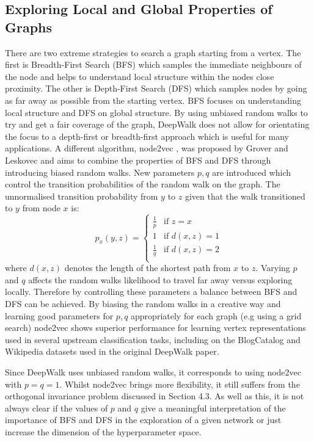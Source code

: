 \documentclass[a4paper]{article}
\begin{document}
\subsection{Exploring Local and Global Properties of Graphs}
There are two extreme strategies to search a graph starting from a vertex. The
first is Breadth-First Search (BFS) which samples the immediate neighbours of
the node and helps to understand local structure within the nodes close
proximity. The other is Depth-First Search (DFS) which samples nodes by going as
far away as possible from the starting vertex. BFS focuses on understanding
local structure and DFS on global structure. By using unbiased random walks to
try and get a fair coverage of the graph, DeepWalk does not allow for
orientating the focus to a depth-first or breadth-first approach which is useful
for many applications. A different algorithm, node2vec \cite{grover_leskovec2016}, was proposed by Grover
and Leskovec and aims to combine the
properties of BFS and DFS through introducing biased random walks. New
parameters $p,q$ are introduced which control the transition probabilities of
the random walk on the graph. The unnormalised transition probability from $y$
to $z$ given that the walk transitioned to $y$ from node $x$ is:
\begin{equation*}
  p_x(y,z)= 
  \begin{cases}
    \frac{1}{p}& \text{if } z = x\\
    1          & \text{if } d(x,z) = 1\\
    \frac{1}{q}& \text{if } d(x,z) = 2\\
  \end{cases}
\end{equation*}
where $d(x,z)$ denotes the length of the shortest path from $x$ to $z$. Varying $p$ and $q$ affects the random walks likelihood to travel far away
versus exploring locally. Therefore by controlling these parameters a balance
between BFS and DFS can be achieved. By biasing the random walks in a creative
way and learning good parameters for $p,q$ appropriately for each graph (e.g
using a grid search) node2vec shows superior performance for learning vertex
representations used in several upstream classification tasks, including on
the BlogCatalog and Wikipedia datasets used in the original DeepWalk paper.

Since DeepWalk uses unbiased random walks, it corresponds to using node2vec with $p=q=1$. Whilst node2vec brings
more flexibility, it still suffers from the orthogonal invariance problem discussed in Section 4.3. As well as this, it is not always clear if the values of $p$ and $q$ give a
meaningful interpretation of the importance of BFS and DFS in the exploration of a given network or just increase the dimension of the hyperparameter space.
\end{document}
